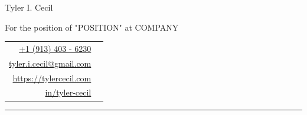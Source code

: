 \documentclass[sans, a4paper, 11pt]{article}
\newcommand{\cvcolor}[1]{{\color{MidnightBlue}#1}}
\begin{document}
\noindent
\begin{minipage}{0.6\linewidth}
 {
 \fontsize{40pt}{50pt}\selectfont
 \noindent
 {Tyler I. Cecil}}\\
 {\Large \color{darkgray} {
   \vspace{-0.75em}

   \noindent
   For the position of "POSITION" at COMPANY
 }}
\end{minipage}
\hfill
{
\begin{tabular}{|rl}
  \href{tel:+1 (913) 403 - 6230}{+1 (913) 403 - 6230}&\cvcolor{\faPhone} \\
  \href{mailto:tyler.i.cecil@gmail.com}{tyler.i.cecil@gmail.com}&\cvcolor{\faEnvelope} \\
  \href{https://tylercecil.com}{https://tylercecil.com}&\cvcolor{\faGlobe} \\
  \href{https://linkedin.com/in/tyler-cecil}{in/tyler-cecil}& \cvcolor{\faLinkedinSquare}\\
\end{tabular}
}

\par\noindent\rule{\textwidth}{0.4pt}\par
\vspace{1em}
\end{document}
